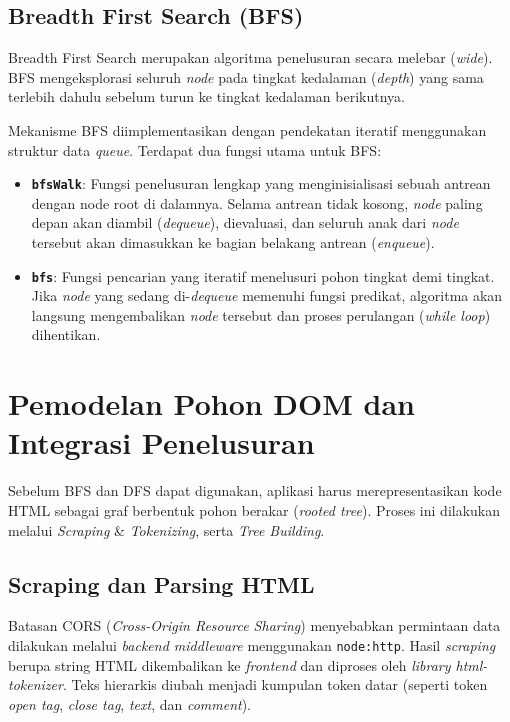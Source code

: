 \subsection{Breadth First Search (BFS)}
Breadth First Search merupakan algoritma penelusuran secara melebar (\textit{wide}). BFS mengeksplorasi seluruh \textit{node} pada tingkat kedalaman (\textit{depth}) yang sama terlebih dahulu sebelum turun ke tingkat kedalaman berikutnya.

Mekanisme BFS diimplementasikan dengan pendekatan iteratif menggunakan struktur data \textit{queue}. Terdapat dua fungsi utama untuk BFS:
\begin{itemize}
    \item \textbf{\texttt{bfsWalk}}: Fungsi penelusuran lengkap yang menginisialisasi sebuah antrean dengan node root di dalamnya. Selama antrean tidak kosong, \textit{node} paling depan akan diambil (\textit{dequeue}), dievaluasi, dan seluruh anak dari \textit{node} tersebut akan dimasukkan ke bagian belakang antrean (\textit{enqueue}).
    \item \textbf{\texttt{bfs}}: Fungsi pencarian yang iteratif menelusuri pohon tingkat demi tingkat. Jika \textit{node} yang sedang di-\textit{dequeue} memenuhi fungsi predikat, algoritma akan langsung mengembalikan \textit{node} tersebut dan proses perulangan (\textit{while loop}) dihentikan.
\end{itemize}

\section{Pemodelan Pohon DOM dan Integrasi Penelusuran}

Sebelum BFS dan DFS dapat digunakan, aplikasi harus merepresentasikan kode HTML sebagai graf berbentuk pohon berakar (\textit{rooted tree}). Proses ini dilakukan melalui \textit{Scraping} \& \textit{Tokenizing}, serta \textit{Tree Building}.

\subsection{Scraping dan Parsing HTML}
Batasan CORS (\textit{Cross-Origin Resource Sharing}) menyebabkan permintaan data dilakukan melalui \textit{backend middleware} menggunakan \texttt{node:http}. Hasil \textit{scraping} berupa string HTML dikembalikan ke \textit{frontend} dan diproses oleh \textit{library html-tokenizer}.  Teks hierarkis diubah menjadi kumpulan token datar (seperti token \textit{open tag}, \textit{close tag}, \textit{text}, dan \textit{comment}).

